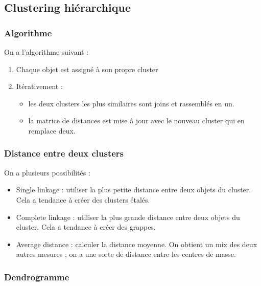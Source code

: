 	\subsection{Clustering hiérarchique}
	
		\subsubsection{Algorithme}
		On a l'algorithme suivant :
	
		\begin{enumerate}
			\item Chaque objet est assigné à son propre cluster
			\item Itérativement :
		
			\begin{itemize}
				\item les deux clusters les plus similaires sont joins et rassemblés en un.
				\item la matrice de distances est mise à jour avec le nouveau cluster qui en remplace deux.
			\end{itemize}
		\end{enumerate}
		
		\subsubsection{Distance entre deux clusters}
		
		On a plusieurs possibilités :
		
		\begin{itemize}
			\item Single linkage : utiliser la plus petite distance entre deux objets du cluster. Cela a tendance à créer des clusters étalés.
			
			\item Complete linkage : utiliser la plus grande distance entre deux objets du cluster. Cela a tendance à créer des grappes.
			
			\item Average distance : calculer la distance moyenne. On obtient un mix des deux autres mesures ; on a une sorte de distance entre les centres de masse.
		\end{itemize}
				
		
		
		\subsubsection{Dendrogramme}
		
